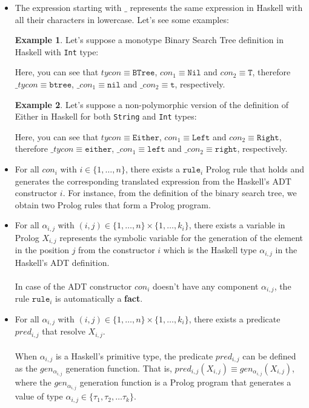 \documentclass{report}
\theoremstyle{definition}
\newtheorem{example}{Example}[section]
\theoremstyle{definition}
\newcommand{\ttt}[1]{\texttt{#1}}
\begin{document}
\begin{itemize}
	\item The expression starting with $\_$ represents the same expression in Haskell with all their characters in lowercase. Let's see some examples:
	      	      	      	      	      
	      \begin{example}
	      	Let's suppose a monotype Binary Search Tree definition in Haskell with \ttt{Int} type:
	      	
	      	Here, you can see that $tycon \equiv \ttt{BTree}$, $con_1 \equiv \ttt{Nil}$ and $con_2 \equiv \ttt{T}$, therefore $\_tycon \equiv \ttt{btree}$, $\_con_1 \equiv \ttt{nil}$ and $\_con_2 \equiv \ttt{t}$, respectively.
	      \end{example}
	      \begin{example}
	      	Let's suppose a non-polymorphic version of the definition of Either in Haskell for both \ttt{String} and \ttt{Int} types:
	      	
	      	Here, you can see that $tycon \equiv \ttt{Either}$, $con_1 \equiv \ttt{Left}$ and $con_2 \equiv \ttt{Right}$, therefore $\_tycon \equiv \ttt{either}$, $\_con_1 \equiv \ttt{left}$ and $\_con_2 \equiv \ttt{right}$, respectively.
	      \end{example}
	      	      	      	      
	\item For all $con_i$ with $i \in \{1, \ldots, n \}$, there exists a $\ttt{rule}_i$ Prolog rule that holds and generates the corresponding translated expression from the Haskell's ADT constructor $i$. For instance, from the definition of the binary search tree, we obtain two Prolog rules that form a Prolog program.
	\item For all $\alpha_{i,j}$ with $(i,j) \in \{1, \ldots, n \} \times \{1, \ldots, k_i \}$, there exists a variable in Prolog $X_{i,j}$ represents the symbolic variable for the generation of the element in the position $j$ from the constructor $i$ which is the Haskell type $\alpha_{i,j}$ in the Haskell's ADT definition.\\\\
	      In case of the ADT constructor $con_i$ doesn't have any component $\alpha_{i,j}$, the rule $\ttt{rule}_i$ is automatically a \textbf{fact}.
	      	      	      
	\item For all $\alpha_{i,j}$ with $(i,j) \in \{1, \ldots, n \} \times \{1, \ldots, k_i \}$, there exists a predicate $pred_{i,j}$ that resolve $X_{i,j}$.\\\\
	      When $\alpha_{i,j}$ is a Haskell's primitive type, the predicate $pred_{i,j}$ can be defined as the $gen_{\alpha_{i,j}}$ generation function. That is, $pred_{i,j}(X_{i,j}) \equiv gen_{\alpha_{i,j}}(X_{i,j})$, where the $gen_{\alpha_{i,j}}$ generation function is a Prolog program that generates a value of type $\alpha_{i,j} \in \{ \tau_1, \tau_2, \ldots \tau_k \}$.
	      	      	      
\end{itemize}
\end{document}
